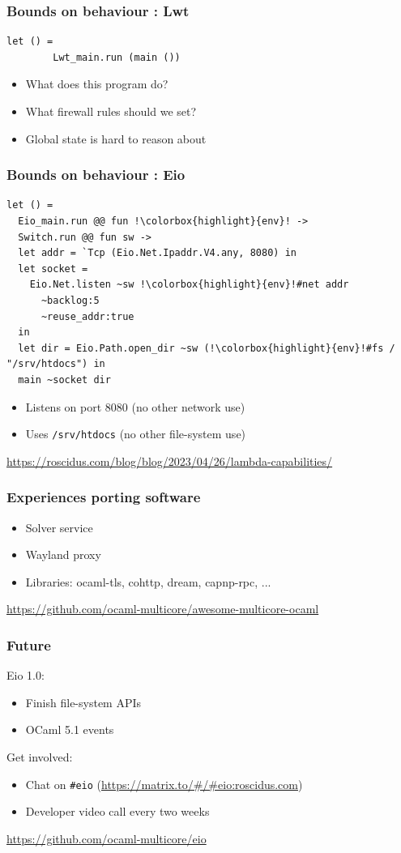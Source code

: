 \documentclass{beamer}
\begin{document}
\begin{frame}[fragile]
	\frametitle{Bounds on behaviour : Lwt}

	\begin{lstlisting}[style=ocaml]
	      let () =
		Lwt_main.run (main ())
	\end{lstlisting}

	\begin{itemize}
		\item What does this program do?
		\item What firewall rules should we set?
		\item Global state is hard to reason about
	\end{itemize}
\end{frame}

\begin{frame}[fragile]
	\frametitle{Bounds on behaviour : Eio}

	\setlength\fboxsep{1.2pt}
	\begin{lstlisting}[style=ocaml,escapechar=!]
let () =
  Eio_main.run @@ fun !\colorbox{highlight}{env}! ->
  Switch.run @@ fun sw ->
  let addr = `Tcp (Eio.Net.Ipaddr.V4.any, 8080) in
  let socket =
    Eio.Net.listen ~sw !\colorbox{highlight}{env}!#net addr
      ~backlog:5
      ~reuse_addr:true
  in
  let dir = Eio.Path.open_dir ~sw (!\colorbox{highlight}{env}!#fs / "/srv/htdocs") in
  main ~socket dir
	\end{lstlisting}
	\begin{itemize}
                \item Listens on port 8080 (no other network use)
                \item Uses \verb|/srv/htdocs| (no other file-system use)
	\end{itemize}
	\bigskip
	\url{https://roscidus.com/blog/blog/2023/04/26/lambda-capabilities/}
\end{frame}

\begin{frame}
	\frametitle{Experiences porting software}
	\begin{itemize}
		\item Solver service
		\item Wayland proxy
		\item Libraries: ocaml-tls, cohttp, dream, capnp-rpc, ...
	\end{itemize}
	\bigskip
	\url{https://github.com/ocaml-multicore/awesome-multicore-ocaml}
\end{frame}

\begin{frame}[fragile]
	\frametitle{Future}
	Eio 1.0:
	\begin{itemize}
		\item Finish file-system APIs
		\item OCaml 5.1 events
	\end{itemize}
	\bigskip
	Get involved:
	\begin{itemize}
		\item Chat on \verb|#eio| (\url{https://matrix.to/#/#eio:roscidus.com})
		\item Developer video call every two weeks
	\end{itemize}
	\bigskip
	\url{https://github.com/ocaml-multicore/eio}
\end{frame}
\end{document}
